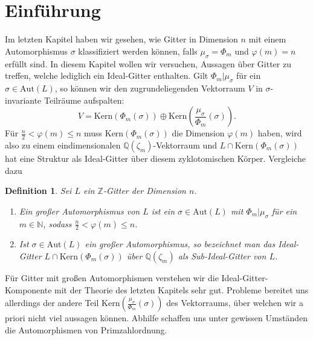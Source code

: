\documentclass[12pt,a4paper,halfparskip,headsepline,bibtotocnumbered]{scrreprt}
\theoremstyle{nummermitklammern}
\newtheorem{definition}[defsatzusw]{Definition}
\theoremstyle{nonumberbreak}
\newcommand{\N}{\mathbb{N}}
\newcommand{\Z}{\mathbb{Z}}
\newcommand{\Q}{\mathbb{Q}}
\newcommand{\Kern}{\text{Kern}}
\newcommand{\Aut}{\text{Aut}}
\begin{document}
\section{Einführung}
Im letzten Kapitel haben wir gesehen, wie Gitter in Dimension $n$ mit einem Automorphismus $\sigma$ klassifiziert werden können, falls $\mu_\sigma = \Phi_m$ und $\varphi(m) = n$ erfüllt sind. In diesem Kapitel wollen wir versuchen, Aussagen über Gitter zu treffen, welche lediglich ein Ideal-Gitter enthalten. Gilt $\Phi_m \vert \mu_\sigma$ für ein $\sigma \in \Aut(L)$, so können wir den zugrundeliegenden Vektorraum $V$ in $\sigma$-invariante Teilräume aufspalten:
\begin{equation*}
	V = \Kern(\Phi_m(\sigma)) \oplus \Kern\left(\frac{\mu_\sigma}{\Phi_m}(\sigma)\right).
\end{equation*}
Für $\frac{n}{2} < \varphi(m) \leq n$ muss $\Kern(\Phi_m(\sigma))$ die Dimension $\varphi(m)$ haben, wird also zu einem eindimensionalen $\Q(\zeta_m)$-Vektorraum und $L \cap \Kern(\Phi_m(\sigma))$ hat eine Struktur als Ideal-Gitter über diesem zyklotomischen Körper. Vergleiche dazu \cite[Abs. (5.3)]{nebe}

\begin{framed}
	\begin{definition}
		Sei $L$ ein $\Z$-Gitter der Dimension $n$.
		\begin{enumerate}[label=(\roman*)]
			\item Ein \textit{großer Automorphismus} von $L$ ist ein $\sigma \in \Aut(L)$ mit $\Phi_m \vert \mu_\sigma$ für ein $m \in \N$, sodass $\frac{n}{2} < \varphi(m) \leq n$.
			\item Ist $\sigma \in \Aut(L)$ ein großer Automorphismus, so bezeichnet man das Ideal-Gitter $L \cap  \Kern(\Phi_m(\sigma))$ über $\Q(\zeta_m)$ als \textit{Sub-Ideal-Gitter} von $L$.
		\end{enumerate}
	\end{definition}
\end{framed}

Für Gitter mit großen Automorphismen verstehen wir die Ideal-Gitter-Komponente mit der Theorie des letzten Kapitels sehr gut. Probleme bereitet uns allerdings der andere Teil $\Kern\left(\frac{\mu_\sigma}{\Phi_m}(\sigma)\right)$ des Vektorraums, über welchen wir a priori nicht viel aussagen können. Abhilfe schaffen uns unter gewissen Umständen die Automorphismen von Primzahlordnung.
\end{document}
